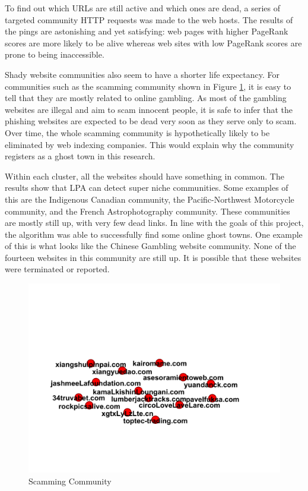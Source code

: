 \documentclass[conference]{IEEEtran}
\begin{document}
To find out which URLs are still active and which ones are dead, a series of targeted community HTTP requests was made to the web hosts. The results of the pings are astonishing and yet satisfying: web pages with higher PageRank scores\cite{ilprints422} are more likely to be alive whereas web sites with low PageRank scores are prone to being inaccessible.

Shady website communities also seem to have a shorter life expectancy. For communities such as the scamming community shown in Figure \ref{fig:dead}, it is easy to tell that they are mostly related to online gambling. As most of the gambling websites are illegal and aim to scam innocent people, it is safe to infer that the phishing websites are expected to be dead very soon as they serve only to scam. Over time, the whole scamming community is hypothetically likely to be eliminated by web indexing companies. This would explain why the community registers as a ghost town in this research.

Within each cluster, all the websites should have something in common. The results show that LPA can detect super niche communities. Some examples of this are the Indigenous Canadian community, the Pacific-Northwest Motorcycle community, and the French Astrophotography community. These communities are mostly still up, with very few dead links. In line with the goals of this project, the algorithm was able to successfully find some online ghost towns. One example of this is what looks like the Chinese Gambling website community. None of the fourteen websites in this community are still up. It is possible that these websites were terminated or reported.

\begin{figure}[!h]
 \centerline{\includegraphics[width=\columnwidth]{figs/07after.png}}
 \caption{Scamming Community} 
 \label{fig:dead}
\end{figure}
\end{document}
